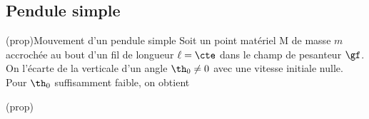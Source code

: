 \documentclass[../../main/main.tex]{subfiles}
\begin{document}
\subsection{Pendule simple}
\begin{tcb*}(prop){Mouvement d'un pendule simple}
	Soit un point matériel M de masse $m$ accrochée au bout d'un fil de longueur
	$\ell = \cte$ dans le champ de pesanteur $\gf$. On l'écarte de la verticale
	d'un angle $\th_0 \neq 0$ avec une vitesse initiale nulle. Pour
	$\th_0$ suffisamment faible, on obtient
	\smallbreak
	\begin{isd}(prop)
		\vspace{-15pt}
		\psw{%
			\[
				\boxed{\tpp(t) + \w_0{}^2\th(t) = 0}
				\qav
				\boxed{\w_0 = \sqrt{\frac{g}{\ell}}}
			\]
		}%
		\vspace{-15pt}
		\tcblower
		\psw{%
			\[
				\boxed{\th(t) = \th_0 \cos(\w_0t)}
			\]
		}%
		\vspace{-15pt}
	\end{isd}
\end{tcb*}
\end{document}

